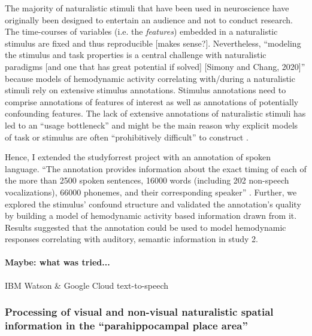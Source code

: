 %
The majority of naturalistic stimuli that have been used in neuroscience have
originally been designed to entertain an audience and not to conduct research.
%
The time-courses of variables (i.e. the \textit{features}) embedded in a
naturalistic stimulus are fixed and thus reproducible [makes sense?].
%
Nevertheless, ``modeling the stimulus and task properties is a central challenge
with naturalistic paradigms [and one that has great potential if solved] [Simony
and Chang, 2020]'' \citep{saarimaki2021naturalistic} because models of
hemodynamic activity correlating with/during a naturalistic stimuli rely on
extensive stimulus annotations.
%
Stimulus annotations need to comprise annotations of features of interest as
well as annotations of potentially confounding features.
%
The lack of extensive annotations of naturalistic stimuli has led to an ``usage
bottleneck'' \citep{aliko2020naturalistic} and might be the main reason why
explicit models of task or stimulus are often ``prohibitively difficult'' to
construct \citep{nastase2019measuring}.

Hence, I extended the studyforrest project with an annotation of spoken
language.
``The annotation provides information about the exact timing of each of the more
than 2500 spoken sentences, 16000 words (including 202 non-speech
vocalizations), 66000 phonemes, and their corresponding speaker''
\citep{haeusler2021speechanno}.
%
Further, we explored the stimulus' confound structure and validated the
annotation's quality by building a model of hemodynamic activity based
information drawn from it.
%
Results suggested that the annotation could be used to model hemodynamic
responses correlating with auditory, semantic information in study 2.


\paragraph{Maybe: what was tried...}

IBM Watson \& Google Cloud text-to-speech


\subsubsection{Processing of visual and non-visual naturalistic spatial
information in the ``parahippocampal place area''}

